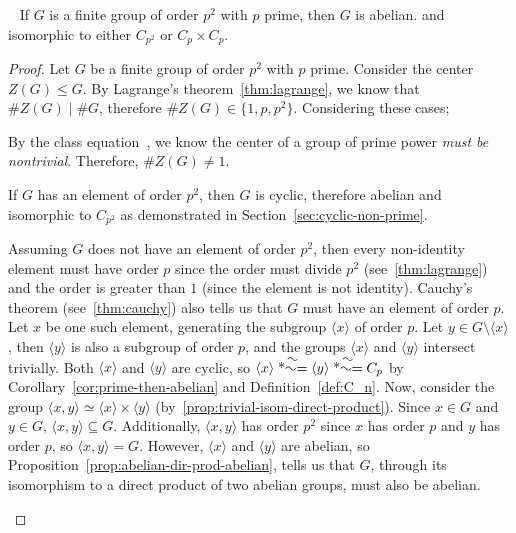 \begin{corollary}~\label{thm:p2-abelian}
  If $G$ is a finite group of order $p^2$ with $p$ prime, then $G$ is abelian.
  and isomorphic to either $C_{p^2}$ or $C_p \times C_p$.
  \begin{proof}
    Let $G$ be a finite group of order $p^2$ with $p$ prime.
    Consider the center $Z(G) \le G$.
    By Lagrange's theorem~\ref{thm:lagrange}, we know that $\#Z(G) \mid \#G$,
    therefore $\#Z(G) \in \{1,p,p^2\}$. Considering these cases;
    \begin{enumalph}
      \item By the class equation~\cite[p.~125,~Theorem~8]{DummitFoote},
        we know the center of a group of prime power \emph{must be nontrivial}.
        Therefore, $\#Z(G) \ne 1$.
      \item If $G$ has an element of order $p^2$, then $G$ is cyclic,
        therefore abelian and isomorphic to $C_{p^2}$
        as demonstrated in Section~\ref{sec:cyclic-non-prime}.
      \item Assuming $G$ does not have an element of order $p^2$,
        then every non-identity element must have order $p$ since the order must divide $p^2$
        (see~\ref{thm:lagrange}) and the order is greater than $1$ (since the element is not identity).
        Cauchy's theorem (see~\ref{thm:cauchy}) also tells us that $G$ must have an element of order $p$.
        Let $x$ be one such element, generating the subgroup $\langle x \rangle$ of order $p$.
        Let $y \in G \setminus \langle x \rangle$, then $\langle y \rangle$
        is also a subgroup of order $p$, and the groups $\langle x \rangle$ and $\langle y \rangle$
        intersect trivially. Both $\langle x \rangle$ and $\langle y \rangle$ are cyclic,
        so $\langle x \rangle \isom \langle y \rangle \isom C_p$
        by Corollary~\ref{cor:prime-then-abelian} and Definition~\ref{def:C_n}.
        Now, consider the group $\langle x, y \rangle \simeq
        \langle x \rangle \times \langle y \rangle$ (by~\ref{prop:trivial-isom-direct-product}).
        Since $x \in G$ and $y \in G$, $\langle x, y \rangle \subseteq G$.
        Additionally, $\langle x, y \rangle$ has order $p^2$
        since $x$ has order $p$ and $y$ has order $p$,
        so $\langle x, y \rangle = G$.
        However, $\langle x \rangle$ and $\langle y \rangle$ are abelian,
        so Proposition~\ref{prop:abelian-dir-prod-abelian},
        tells us that $G$, through its isomorphism to a direct product of two abelian  groups,
        must also be abelian.
    \end{enumalph}
  \end{proof}
\end{corollary}

